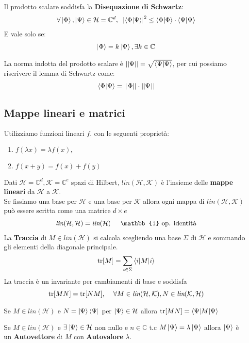 \documentclass{report}
\begin{document}
Il prodotto scalare soddisfa la \textbf{Disequazione di Schwartz}:
$$\forall \ket{\Phi},\ket{\Psi} \in \mathcal{H} = \mathbb{C}^d, \hspace{0.2cm} \left|\braket{\Phi|\Psi} \right|^2 \le \braket{\Phi|\Phi} \cdot \braket{\Psi|\Psi}$$
E vale solo se: $$\ket{\Phi} = k\ket{\Psi}, \exists k \in\mathbb{C}$$
 
La norma indotta del prodotto scalare è $\left| \left| \Psi\right| \right| = \sqrt{\braket{\Psi|\Psi}}$, per cui possiamo riscrivere il lemma di Schwartz come:
$$\braket{\Phi|\Psi} = \left| \left|\Phi \right| \right| \cdot \left| \left|\Psi \right| \right|$$
\newpage 
\subsection{Mappe lineari e matrici}
Utilizziamo funzioni lineari $f$, con le seguenti proprietà:
\begin{enumerate}
    \item $f(\lambda x) = \lambda f(x)$,
    \item $f(x+y) = f(x) + f(y)$ 
\end{enumerate}

Dati $\mathcal{H}= \mathbb{C}^d, \mathcal{K} = \mathbb{C}^e$ spazi di Hilbert, $\textit{lin}(\mathcal{H},\mathcal{K})$ è l'insieme delle \textbf{mappe lineari} da $\mathcal{H}$ a $\mathcal{K}$.\\ Se fissiamo una base per $\mathcal{H}$ e una base per $\mathcal{K}$ allora ogni mappa di $\textit{lin}(\mathcal{H},\mathcal{K})$ può essere scritta come una matrice $d\times e$
$$\textit{lin}(\mathcal{H},\mathcal{H}) = \textit{lin}(\mathcal{H}) \hspace{0.5cm} \mathbb{1} \text{ op. identità}$$
La \textbf{Traccia} di $M \in \textit{lin}(\mathcal{H})$ si calcola scegliendo una base $\Sigma$ di $\mathcal{H}$ e sommando gli elementi della diagonale principale.
$$\text{tr}[M] = \sum_{i \in \Sigma} \braket{i|M|i}$$
La traccia  è un invariante  per cambiamenti di base e soddisfa 
$$\text{tr}[MN] = \text{tr}[NM],\hspace{0.4cm} \forall M\in \textit{lin}(\mathcal{H,K}),N\in \textit{lin}(\mathcal{K,H})$$

Se $M\in \textit{lin}(\mathcal{H})$ e $N = \ket{\Psi}\bra{\Psi}$ per $\ket{\Psi}\in \mathcal{H}$ allora 
$\text{tr}[MN]=\braket{\Psi|M|\Psi}$

Se $M\in \textit{lin}(\mathcal{H})$ e $\exists\ket{\Psi}\in \mathcal{H}$ non nullo e $n \in \mathbb{C}$ t.c $M \ket{\Psi} = \lambda \ket{\Psi}$ allora $\ket{\Psi}$ è un \textbf{Autovettore} di $M$ con \textbf{Autovalore} $\lambda$.
\end{document}
